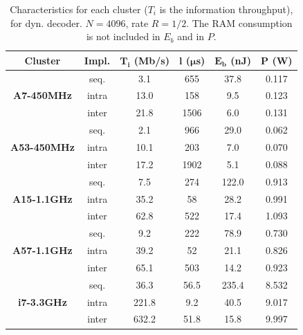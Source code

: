 \begin{table}
  \caption{Characteristics for each cluster ($T_i$ is the information
    throughput), for dyn. decoder. $N = 4096$, rate $R = 1/2$. The RAM
    consumption is not included in $E_b$ and in $P$.}
  \label{tab:polar_energy_results}
  \begin{center}
  \begin{tabular}{c | c  c  c  c  c}
    \textbf{Cluster} &
    \textbf{Impl.} &
    $\boldsymbol{T_i}$ \textbf{(Mb/s)} &
    $\boldsymbol{l}$   \textbf{($\boldsymbol{\mu}$s)} &
    $\boldsymbol{E_b}$ \textbf{(nJ)} &
    $\boldsymbol{P}$   \textbf{(W)}\\
    \hline
    \hline
    \multirow{3}{*}{\textbf{A7-450MHz}}  & seq.  &  3.1 &  655 &  37.8 & 0.117 \\
                                         & intra & 13.0 &  158 &   9.5 & 0.123 \\
                                         & inter & 21.8 & 1506 &   6.0 & 0.131 \\
    \hline
    \multirow{3}{*}{\textbf{A53-450MHz}} & seq.  &  2.1 &  966 &  29.0 & 0.062 \\
                                         & intra & 10.1 &  203 &   7.0 & 0.070 \\
                                         & inter & 17.2 & 1902 &   5.1 & 0.088 \\
    \hline
    \multirow{3}{*}{\textbf{A15-1.1GHz}} & seq.  &  7.5 &  274 & 122.0 & 0.913 \\
                                         & intra & 35.2 &   58 &  28.2 & 0.991 \\
                                         & inter & 62.8 &  522 &  17.4 & 1.093 \\
    \hline
    \multirow{3}{*}{\textbf{A57-1.1GHz}} & seq.  &  9.2 &  222 &  78.9 & 0.730 \\
                                         & intra & 39.2 &   52 &  21.1 & 0.826 \\
                                         & inter & 65.1 &  503 &  14.2 & 0.923 \\
    \hline
    \multirow{3}{*}{\textbf{i7-3.3GHz}} & seq.  &  36.3 & 56.5 & 235.4 & 8.532 \\
                                        & intra & 221.8 &  9.2 &  40.5 & 9.017 \\
                                        & inter & 632.2 & 51.8 &  15.8 & 9.997 \\
  \end{tabular}
  \end{center}
\end{table}

